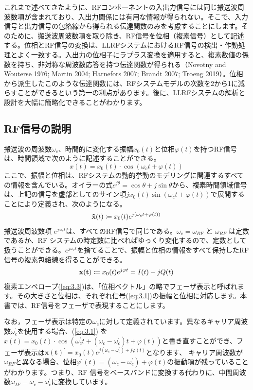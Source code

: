 \documentclass[book]{jlreq}
\begin{document}
これまで述べてきたように、RFコンポーネントの入出力信号には同じ搬送波周波数項が含まれており、入出力関係には有用な情報が得られない。そこで、入力信号と出力信号の包絡線から得られる伝達関数のみを考慮することにします。そのために、搬送波周波数項を取り除き、RF信号を位相（複素信号）として記述する。位相とRF信号の変換は、LLRFシステムにおけるRF信号の検出・作動処理とよく一致する。入出力の位相子にラプラス変換を適用すると、複素数値の係数を持ち、非対称な周波数応答を持つ伝達関数が得られる（Novotny and Wouterse 1976; Martin 2004; Harnefors 2007; Brandt 2007; Troeng 2019）。位相から派生したこのような伝達関数には、RFシステムモデルの次数を2から1に減らすことができるという第一の利点があります。後に、LLRFシステムの解析と設計を大幅に簡略化できることがわかります。

\subsection{RF信号の説明}

搬送波の周波数$\omega_c$、時間的に変化する振幅$x_0(t)$と位相$\varphi(t)$を持つRF信号は、時間領域で次のように記述することができる。
%
\begin{equation}
    x(t) = x_0(t) \cdot \cos(\omega_c t + \varphi (t))
    \label{eq:3.1}
\end{equation}
%
ここで、振幅と位相は、RFシステムの動的挙動のモデリングに関連するすべての情報を含んでいる。オイラーの式$e^{j\theta} = \cos\theta + j \sin\theta$から、複素時間領域信号は、上記の信号を虚部としてのサイン項$j x_0(t) \sin (\omega_c t + \varphi (t))$で展開することにより定義され、次のようになる。
%
\begin{equation}
    \tilde{\vb{x}}(t) \coloneqq x_0(t) e^{j(\omega_c t+\varphi(t))}
    \label{eq:3.2}
\end{equation}
%
搬送波周波数項 $e^{j\omega_c t}$は、すべてのRF信号で同じである。$\omega_c = \omega_{RF}$ と $\omega_{RF}$ は定数であるか、RF システムの時定数に比べればゆっくり変化するので、定数として扱うことができる。$e^{j\omega_c t}$を捨てることで、振幅と位相の情報をすべて保持したRF信号の複素包絡線を得ることができる。
%
\begin{equation}
    \vb{x(t)} \coloneqq x_0(t) e^{j\varphi t} = I(t) + j Q(t)
    \label{eq:3.3} 
\end{equation}
%
複素エンベロープ(\ref{eq:3.3})は、「位相ベクトル」の略でフェーザ表示と呼ばれます。その大きさと位相は、それぞれ信号(\ref{eq:3.1})の振幅と位相に対応します。本書では、RF信号をフェーザで表現することにします。

なお，フェーザ表示は特定の$\omega_c$に対して定義されています。異なるキャリア周波数$\omega_c^{\prime}$を使用する場合、(\ref{eq:3.1}) を $x(t) = x_0(t)\cdot \cos(\omega_c^{\prime} t + (\omega_c - \omega_c^{\prime}) t + \varphi (t))$と書き直すことができ、フェーザ表示は$\bm{x(t)}^{\prime} = x_0(t) e^{j (\omega_c - \omega_c^{\prime}) + j \varphi (t)}$となります、
キャリア周波数が$\omega_{RF}$と異なる場合、位相$\varphi^{\prime} (t) = (\omega_c - \omega_c^{\prime}) + \varphi (t)$の振動項が残っていることがわかります。つまり、RF 信号をベースバンドに変換する代わりに、中間周波数$\omega_{IF} = \omega_c - \omega_c^{\prime}$に変換しています。
\end{document}
